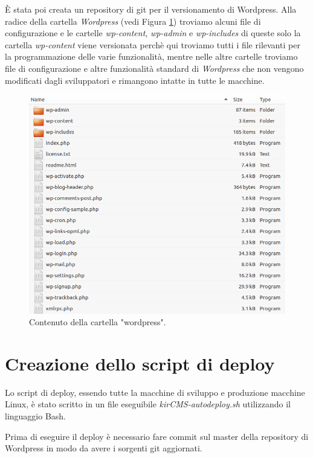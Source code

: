 È stata poi creata un repository di git per il versionamento di Wordpress. 
Alla radice della cartella \emph{Wordpress} (vedi Figura \ref{fig:wptree}) troviamo alcuni file di configurazione e le cartelle \emph{wp-content}, \emph{wp-admin} e \emph{wp-includes}\cite{WPDIR} di queste solo la
cartella \emph{wp-content} viene versionata perchè qui troviamo tutti i file rilevanti per la programmazione delle varie funzionalità, mentre nelle
altre cartelle troviamo file di configurazione e altre funzionalità standard di \emph{Wordpress} che non vengono modificati dagli sviluppatori
e rimangono intatte in tutte le macchine.

\begin{figure}
  \includegraphics[width=\textwidth]{figure/wpfolder.png}
  \caption{Contenuto della cartella "wordpress".}
  \label{fig:wptree}
\end{figure}

\section{Creazione dello script di deploy}
Lo script di deploy, essendo tutte la macchine di sviluppo e produzione macchine Linux, è stato scritto in un file eseguibile
\emph{kirCMS-autodeploy.sh} utilizzando il linguaggio Bash.

Prima di eseguire il deploy è necessario fare commit sul master della repository di Wordpress in modo da avere i sorgenti git aggiornati.

